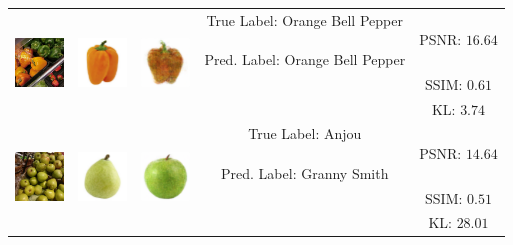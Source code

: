 \begin{tabular}{c c c c c}
	\midrule
	\multirow{3}{*}{\includegraphics[width=13mm, height=13mm]{PaperB/figures_and_tables/decoded_iconic_images/Orange-Bell-Pepper_008.jpg}} & \multirow{3}{*}{\includegraphics[width=13mm, height=13mm]{PaperB/figures_and_tables/iconic_image_figures/Orange-Bell-Pepper_Iconic.jpg}} & \multirow{3}{*}{\includegraphics[width=13mm, height=13mm]{PaperB/figures_and_tables/decoded_iconic_images/vcca_xiwy_NEW/orange_bell_pepper_image2191.png}} & \multirowcell{3}{True Label: Orange Bell Pepper\\ \\ Pred. Label: Orange Bell Pepper} & PSNR: $16.64$ \\
	& & & & SSIM: $0.61$ \\
	& & & & KL: $3.74$ \\
	
	\midrule
	\multirow{3}{*}{\includegraphics[width=13mm, height=13mm]{PaperB/figures_and_tables/decoded_iconic_images/Anjou_015.jpg}} & \multirow{3}{*}{\includegraphics[width=13mm, height=13mm]{PaperB/figures_and_tables/iconic_image_figures/Anjou-Pear_Clean.jpg}} & \multirow{3}{*}{\includegraphics[width=13mm, height=13mm]{PaperB/figures_and_tables/decoded_iconic_images/vcca_xiwy_NEW/anjou_pear_image849.png}} & \multirowcell{3}{True Label: Anjou\\ \\ Pred. Label: Granny Smith} & PSNR: $14.64$ \\
	& & & & SSIM: $0.51$ \\
	& & & & KL: $28.01$ \\
	

\end{tabular}
